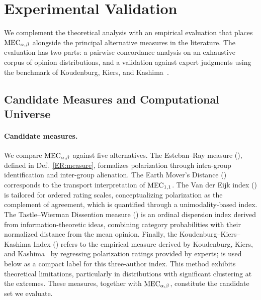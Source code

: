 \section{Experimental Validation}\label{sec:experiments}

We complement the theoretical analysis with an empirical evaluation that places $\MEC$ alongside the principal alternative measures in the literature. The evaluation has two parts: a pairwise concordance analysis on an exhaustive corpus of opinion distributions, and a validation against expert judgments using the benchmark of Koudenburg, Kiers, and Kashima~\cite{koudenburg2021new}.

\subsection{Candidate Measures and Computational Universe}\label{sec:candidates-corpus}

\paragraph{Candidate measures.}
We compare $\MEC$ against five alternatives. The Esteban--Ray measure (\ERLabel), defined in Def.~\ref{ER:measure}, formalizes polarization through intra-group identification and inter-group alienation. The Earth Mover's Distance (\EMDLabel) corresponds to the transport interpretation of \(\MEC[1,1]\). The Van der Eijk index (\VdELabel) is tailored for ordered rating scales, conceptualizing polarization as the complement of agreement, which is quantified through a unimodality-based index. The Tastle--Wierman Dissention measure (\TWDLabel) is an ordinal dispersion index derived from information-theoretic ideas, combining category probabilities with their normalized distance from the mean opinion. Finally, the Koudenburg--Kiers--Kashima Index (\KILabel) refers to the empirical measure derived by Koudenburg, Kiers, and Kashima~\cite{koudenburg2021new} by regressing polarization ratings provided by experts; \KILabel{} is used below as a compact label for this three-author index. This method exhibits theoretical limitations, particularly in distributions with significant clustering at the extremes. These measures, together with $\MEC$, constitute the candidate set we evaluate.

